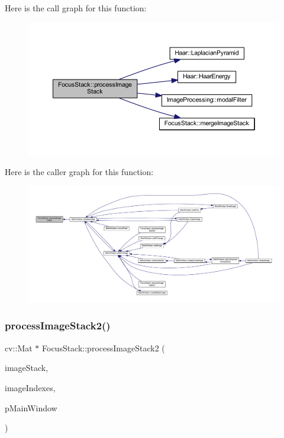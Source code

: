 Here is the call graph for this function\+:
\nopagebreak
\begin{figure}[H]
\begin{center}
\leavevmode
\includegraphics[width=350pt]{class_focus_stack_aca40f92aa05f5aa0a2e58c846bb69a75_cgraph}
\end{center}
\end{figure}
Here is the caller graph for this function\+:
\nopagebreak
\begin{figure}[H]
\begin{center}
\leavevmode
\includegraphics[width=350pt]{class_focus_stack_aca40f92aa05f5aa0a2e58c846bb69a75_icgraph}
\end{center}
\end{figure}
\mbox{\label{class_focus_stack_a6342aff10617c4346b32f61ea549b378}} 
\subsubsection{\texorpdfstring{process\+Image\+Stack2()}{processImageStack2()}}
{\footnotesize\ttfamily cv\+::\+Mat $\ast$ Focus\+Stack\+::process\+Image\+Stack2 (\begin{DoxyParamCaption}\item[{std\+::vector$<$ \hyperlink{classtargeter_image}{targeter\+Image} $>$ \&}]{image\+Stack,  }\item[{std\+::vector$<$ int $>$ \&}]{image\+Indexes,  }\item[{\hyperlink{class_main_window}{Main\+Window} $\ast$}]{p\+Main\+Window }\end{DoxyParamCaption})\hspace{0.3cm}{\ttfamily [static]}}

